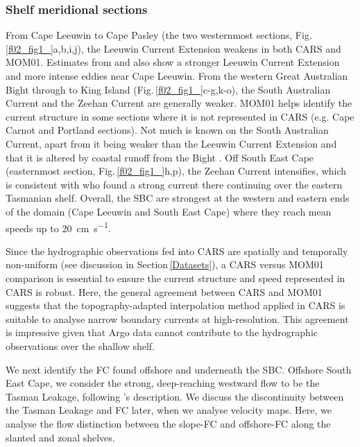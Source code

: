 \documentclass[preprint,3p,review,12pt]{elsarticle}
\newcommand{\citepos}[1]{\citeauthor{#1}'s \citeyearpar{#1}}
\begin{document}
\subsubsection{Shelf meridional sections}\label{Shelf meridional sections}
From Cape Leeuwin to Cape Pasley (the two westernmost sections, Fig.\,\ref{f02_fig1_}a,b,i,j), the Leeuwin Current Extension weakens in both CARS and MOM01. Estimates from \citet{Cresswell2004} and \citet{Cresswell1993} also show a stronger Leeuwin Current Extension and more intense eddies near Cape Leeuwin. From the western Great Australian Bight through to King Island (Fig.\,\ref{f02_fig1_}c-g,k-o), the South Australian Current and the Zeehan Current are generally weaker. MOM01 helps identify the current structure in some sections where it is not represented in CARS (e.g. Cape Carnot and Portland sections). Not much is known on the South Australian Current, apart from it being weaker than the Leeuwin Current Extension \citep{Middleton2007} and that it is altered by coastal runoff from the Bight \citep{Rochford1986}. Off South East Cape (easternmost section, Fig.\,\ref{f02_fig1_}h,p), the Zeehan Current intensifies, which is consistent with \citet{Oliver2016,Oliver2018b} who found a strong current there continuing over the eastern Tasmanian shelf. Overall, the SBC are strongest at the western and eastern ends of the domain (Cape Leeuwin and South East Cape) where they reach mean speeds up to \SI{20}{\centi\meter\per\second}.

Since the hydrographic observations fed into CARS are spatially and temporally non-uniform (see \citeauthor{Ridgway2002} \citeyear{Ridgway2002} discussion in Section\,\ref{Datasets}), a CARS versus MOM01 comparison is essential to ensure the current structure and speed represented in CARS is robust. Here, the general agreement between CARS and MOM01 suggests that the topography-adapted interpolation method applied in CARS is suitable to analyse narrow boundary currents at high-resolution. This agreement is impressive given that Argo data cannot contribute to the hydrographic observations over the shallow shelf. 

We next identify the FC found offshore and underneath the SBC. Offshore South East Cape, we consider the strong, deep-reaching westward flow to be the Tasman Leakage, following \citepos{Speich2002,vanSebille2012,vanSebille2014} description. We discuss the discontinuity between the Tasman Leakage and FC later, when we analyse velocity maps. Here, we analyse the flow distinction between the slope-FC and offshore-FC along the slanted and zonal shelves.
\end{document}
